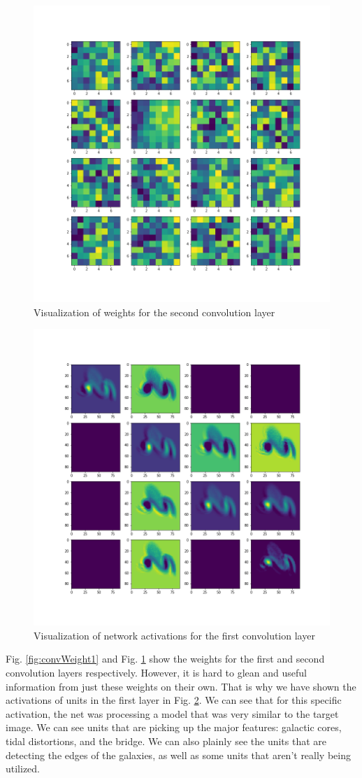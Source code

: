 \documentclass[conference]{IEEEtran}
\begin{document}
\begin{figure}[htbp]
\centerline{\includegraphics[width=0.75\linewidth]{./Images/convWeight2.png}}
\caption{Visualization of weights for the second convolution layer}
\label{fig:convWeight2}
\end{figure}

\begin{figure}[htbp]
\centerline{\includegraphics[width=0.75\linewidth]{./Images/layer1activations.png}}
\caption{Visualization of network activations for the first convolution layer}
\label{fig:layer1activations}
\end{figure}

Fig. \ref{fig:convWeight1} and Fig. \ref{fig:convWeight2} show the weights for the first and second convolution layers respectively. However, it is hard to glean and useful information from just these weights on their own. That is why we have shown the activations of units in the first layer in Fig. \ref{fig:layer1activations}. We can see that for this specific activation, the net was processing a model that was very similar to the target image. We can see units that are picking up the major features: galactic cores, tidal distortions, and the bridge. We can also plainly see the units that are detecting the edges of the galaxies, as well as some units that aren't really being utilized.
\end{document}
